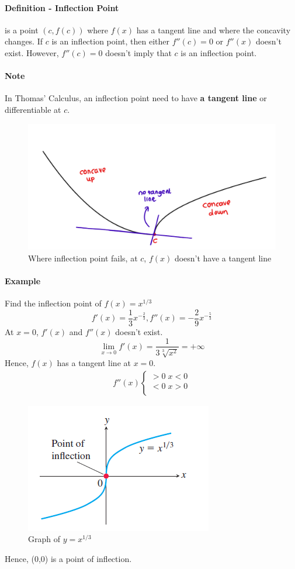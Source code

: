 \documentclass[12pt]{article}
\begin{document}
\paragraph{Definition - Inflection Point} is a point $(c, f(c))$ where $f(x)$ has a tangent line and where the concavity changes.
If $c$ is an inflection point, then either $f''(c) = 0$ or $f''(x)$ doesn't exist. However, $f''(c) = 0$ doesn't imply that $c$ is an inflection point.
\paragraph{Note} In Thomas' Calculus, an inflection point need to have \textbf{a tangent line} or differentiable at $c$.
\begin{figure}[h!]
    \centering
    \includegraphics[width = 0.45\linewidth]{Images/inflection fail.png}
    \caption{Where inflection point fails, at $c$, $f(x)$ doesn't have a tangent line}
\end{figure}
\paragraph{Example} Find the inflection point of $f(x) = x^{1/3}$
\[
    f'(x) = \frac{1}{3}x^{ - \frac{2}{3}}, f''(x) = - \frac{2}{9} x^{ - \frac{5}{3}}
\]
At $x = 0$, $f'(x)$ and $f''(x)$ doesn't exist.
\[
    \lim_{x \to 0} f'(x) = \frac{1}{3 \sqrt[3]{x^2}} = + \infty
\]
Hence, $f(x)$ has a tangent line at $x = 0$.
\begin{align*} 
     f''(x)
     \begin{cases} 
        > 0 \; x < 0 \\
        < 0 \; x > 0 \\
    \end{cases} 
\end{align*}

\begin{figure}[h!]
     \centering
     \includegraphics[width = 0.4\linewidth]{Images/inflection example.png}
     \caption{Graph of $y = x^{1/3}$}
\end{figure}
Hence, (0,0) is a point of inflection.
\end{document}

